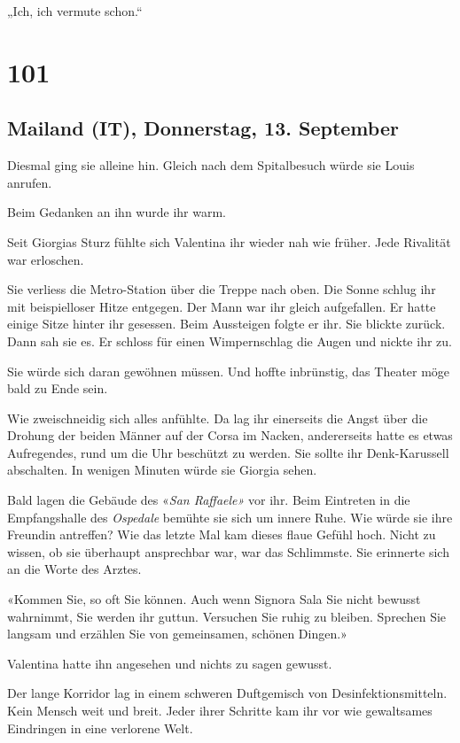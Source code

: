 „Ich, ich vermute schon.``

\chapter{101}\label{section-101}

\section{Mailand (IT), Donnerstag, 13.
September}\label{mailand-it-donnerstag-13.-september}

Diesmal ging sie alleine hin. Gleich nach dem Spitalbesuch würde sie
Louis anrufen.

Beim Gedanken an ihn wurde ihr warm.

Seit Giorgias Sturz fühlte sich Valentina ihr wieder nah wie früher.
Jede Rivalität war erloschen.

Sie verliess die Metro-Station über die Treppe nach oben. Die Sonne
schlug ihr mit beispielloser Hitze entgegen. Der Mann war ihr gleich
aufgefallen. Er hatte einige Sitze hinter ihr gesessen. Beim Aussteigen
folgte er ihr. Sie blickte zurück. Dann sah sie es. Er schloss für einen
Wimpernschlag die Augen und nickte ihr zu.

Sie würde sich daran gewöhnen müssen. Und hoffte inbrünstig, das Theater
möge bald zu Ende sein.

Wie zweischneidig sich alles anfühlte. Da lag ihr einerseits die Angst
über die Drohung der beiden Männer auf der Corsa im Nacken, andererseits
hatte es etwas Aufregendes, rund um die Uhr beschützt zu werden. Sie
sollte ihr Denk-Karussell abschalten. In wenigen Minuten würde sie
Giorgia sehen.

Bald lagen die Gebäude des «\emph{San Raffaele»} vor ihr. Beim Eintreten
in die Empfangshalle des \emph{Ospedale} bemühte sie sich um innere
Ruhe. Wie würde sie ihre Freundin antreffen? Wie das letzte Mal kam
dieses flaue Gefühl hoch. Nicht zu wissen, ob sie überhaupt ansprechbar
war, war das Schlimmste. Sie erinnerte sich an die Worte des Arztes.

«Kommen Sie, so oft Sie können. Auch wenn Signora Sala Sie nicht bewusst
wahrnimmt, Sie werden ihr guttun. Versuchen Sie ruhig zu bleiben.
Sprechen Sie langsam und erzählen Sie von gemeinsamen, schönen Dingen.»

Valentina hatte ihn angesehen und nichts zu sagen gewusst.

Der lange Korridor lag in einem schweren Duftgemisch von
Desinfektionsmitteln. Kein Mensch weit und breit. Jeder ihrer Schritte
kam ihr vor wie gewaltsames Eindringen in eine verlorene Welt.

